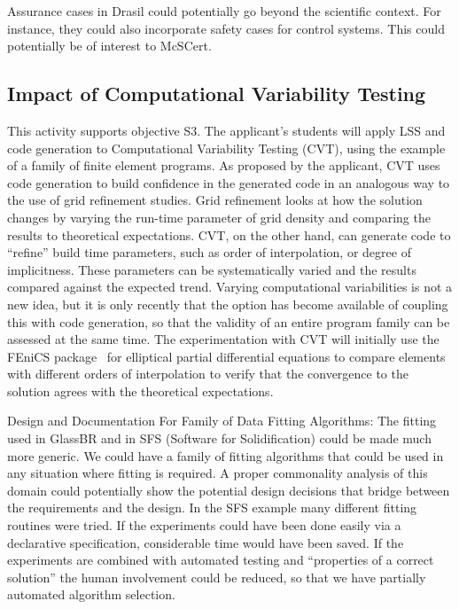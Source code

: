 \documentclass[12pt]{article}
\begin{document}
Assurance cases in Drasil could potentially go beyond the scientific context.
For instance, they could also incorporate safety cases for
control systems.  This could potentially be of interest to McSCert.

\subsection{Impact of Computational Variability Testing} \label{SecCVT}

This activity supports objective S3.  The applicant's students will apply LSS
and code generation to Computational Variability Testing (CVT), using the
example of a family of finite element programs.  As proposed by the applicant,
CVT uses code generation to build confidence in the generated code in an
analogous way to the use of grid refinement studies.  Grid refinement looks at
how the solution changes by varying the run-time parameter of grid density and
comparing the results to theoretical expectations.  CVT, on the other hand, can
generate code to ``refine'' build time parameters, such as order of
interpolation, or degree of implicitness.  These parameters can be
systematically varied and the results compared against the expected trend.
Varying computational variabilities is not a new idea, but it is only recently
that the option has become available of coupling this with code generation, so
that the validity of an entire program family can be assessed at the same time.
The experimentation with CVT will initially use the FEniCS
package~\citep{LoggEtAl2012} for elliptical partial differential equations to
compare elements with different orders of interpolation to verify that the
convergence to the solution agrees with the theoretical expectations.

{Design and Documentation For Family of Data Fitting Algorithms}: The fitting
used in GlassBR and in SFS (Software for Solidification) could be made much more
generic.  We could have a family of fitting algorithms that could be used in any
situation where fitting is required.  A proper commonality analysis of this
domain could potentially show the potential design decisions that bridge between
the requirements and the design.  In the SFS example many different fitting
routines were tried.  If the experiments could have been done easily via a
declarative specification, considerable time would have been saved.  If the
experiments are combined with automated testing and ``properties of a correct
solution'' the human involvement could be reduced, so that we have partially
automated algorithm selection.
\end{document}
